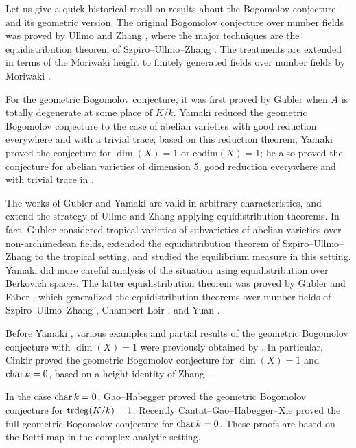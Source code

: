 Let us give a quick historical recall on results about the Bogomolov conjecture and its geometric version.
The original Bogomolov conjecture over number fields was proved by Ullmo \cite{Ullmo1998} and Zhang \cite{Zhang1998}, where the major techniques are the equidistribution theorem of Szpiro--Ullmo--Zhang \cite{SUZ}.
The treatments are extended in terms of the Moriwaki height to finitely generated fields over number fields by Moriwaki \cite{Moriwaki2000}.

For the geometric Bogomolov conjecture, it was first proved by Gubler \cite{Gubler2007} when $A$ is totally degenerate at some place of $K/k$.
Yamaki \cite{Yamaki2016c,Yamaki2016a} reduced the geometric Bogomolov conjecture to the case of abelian varieties with good reduction everywhere and with a trivial trace; based on this reduction theorem, Yamaki \cite{Yamaki2017} proved the conjecture for $\dim(X)=1$ or $\mathrm{codim}(X)=1$; he also proved the conjecture for abelian varieties of dimension 5, good reduction everywhere and with trivial trace in \cite{Yamaki2017a}.

The works of Gubler \cite{Gubler2007} and Yamaki \cite{Yamaki2016c} are
valid in arbitrary characteristics, and extend the strategy of Ullmo and Zhang applying equidistribution theorems.
In fact, Gubler \cite{Gubler2007} considered tropical varieties of subvarieties of abelian varieties over non-archimedean fields,
extended the equidistribution theorem of Szpiro--Ullmo--Zhang to the tropical setting, and studied the equilibrium measure in this setting.
Yamaki \cite{Yamaki2016c} did more careful analysis of the situation using equidistribution over Berkovich spaces. The latter equidistribution theorem was proved by Gubler \cite{Guber2008} and Faber \cite{Faber2009b}, which generalized the equidistribution theorems over number fields of Szpiro--Ullmo--Zhang \cite{SUZ},  Chambert-Loir \cite{CL2006}, and Yuan \cite{Yuan2008}.

Before Yamaki \cite{Yamaki2017}, various examples and partial results of the geometric Bogomolov conjecture with $\dim(X)=1$ were previously obtained by \cite{Parshin,Moriwaki1996,Moriwaki1997,Moriwaki1998,Yamaki2002,Yamaki2008,Faber2009,Cinkir2011}.
In particular, Cinkir \cite{Cinkir2011} proved the geometric Bogomolov conjecture for
$\dim(X)=1$ and ${\rm char\,} k=0$, based on a height identity of Zhang \cite{Zhang2010}.

In the case ${\rm char\,} k=0$, Gao--Habegger  \cite{Gao2019} proved the geometric Bogomolov conjecture for ${\mathrm{trdeg}}(K/k)=1$.
Recently Cantat--Gao--Habegger--Xie \cite{Cantat2021} proved the full geometric Bogomolov conjecture for ${\rm char\,} k=0$.
These proofs are based on the Betti map in the complex-analytic setting.





